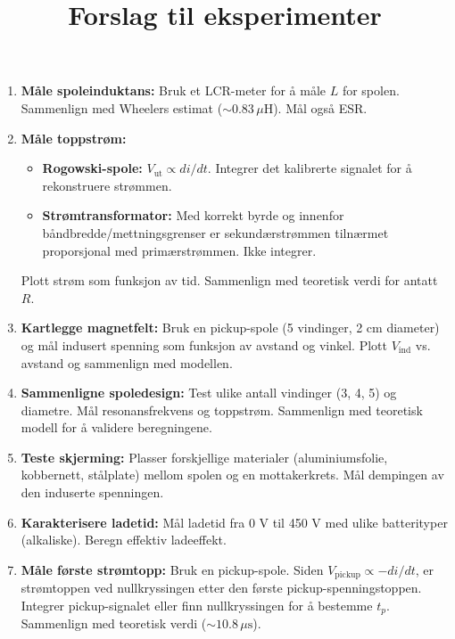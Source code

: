 \documentclass{article}
\title{Forslag til eksperimenter}
\author{}
\date{}
\begin{document}
\maketitle

\begin{enumerate}
\item \textbf{Måle spoleinduktans:} Bruk et LCR-meter for å måle $L$ for spolen. Sammenlign med Wheelers estimat ($\sim 0.83\,\mu\text{H}$). Mål også ESR.

\item \textbf{Måle toppstrøm:}
  \begin{itemize}
  \item \textbf{Rogowski-spole:} $V_{\text{ut}} \propto di/dt$. Integrer det kalibrerte signalet for å rekonstruere strømmen.
  \item \textbf{Strømtransformator:} Med korrekt byrde og innenfor båndbredde/mettningsgrenser er sekundærstrømmen tilnærmet proporsjonal med primærstrømmen. Ikke integrer.
  \end{itemize}
  Plott strøm som funksjon av tid. Sammenlign med teoretisk verdi for antatt $R$.

\item \textbf{Kartlegge magnetfelt:} Bruk en pickup-spole (5 vindinger, 2 cm diameter) og mål indusert spenning som funksjon av avstand og vinkel. Plott $V_{\text{ind}}$ vs. avstand og sammenlign med modellen.

\item \textbf{Sammenligne spoledesign:} Test ulike antall vindinger (3, 4, 5) og diametre. Mål resonansfrekvens og toppstrøm. Sammenlign med teoretisk modell for å validere beregningene.

\item \textbf{Teste skjerming:} Plasser forskjellige materialer (aluminiumsfolie, kobbernett, stålplate) mellom spolen og en mottakerkrets. Mål dempingen av den induserte spenningen.

\item \textbf{Karakterisere ladetid:} Mål ladetid fra 0 V til 450 V med ulike batterityper (alkaliske). Beregn effektiv ladeeffekt.

\item \textbf{Måle første strømtopp:} Bruk en pickup-spole. Siden $V_{\text{pickup}} \propto -di/dt$, er strømtoppen ved nullkryssingen etter den første pickup-spenningstoppen. Integrer pickup-signalet eller finn nullkryssingen for å bestemme $t_p$. Sammenlign med teoretisk verdi ($\sim 10.8\,\mu\text{s}$).
\end{enumerate}
\end{document}
